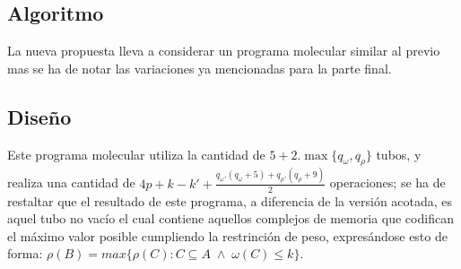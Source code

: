 \documentclass[12pt, letterpaper, twoside]{article}
\begin{document}
    \subsection{Algoritmo}
    La nueva propuesta lleva a considerar un programa molecular similar al previo mas se ha de notar las variaciones ya mencionadas para la parte final.
    \begin{algorithm}
        \begin{algorithmic}[1]
            \EndFor
                \Else
                \EndIf
            \EndWhile
            \EndProcedure
        \end{algorithmic}
    \end{algorithm}
    \subsection{Diseño}
    Este programa molecular utiliza la cantidad de $5+2.\max{\{q_\omega,q_\rho\}}$ tubos, y realiza una cantidad de $4p+k-k'+\frac{q_\omega.(q_\omega+5)+q_\rho.(q_\rho+9)}{2}$ operaciones; se ha de restaltar que el resultado de este programa, a diferencia de la versión acotada, es aquel tubo no vacío el cual contiene aquellos complejos de memoria que codifican el máximo valor posible cumpliendo la restrinción de peso, expresándose esto de forma: $\rho(B) = max\{\rho(C):C\subseteq A\;\land\;\omega(C) \leq k\}$.
\end{document}
